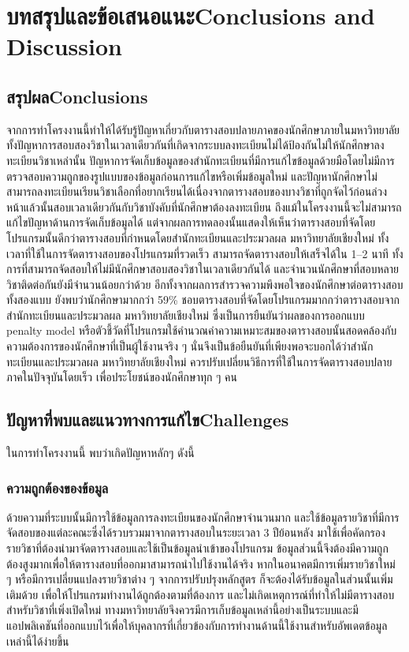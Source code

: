 \chapter{\ifcpe บทสรุปและข้อเสนอแนะ\else Conclusions and Discussion\fi}

\section{\ifcpe สรุปผล\else Conclusions\fi}

จากการทำโครงงานนี้ทำให้ได้รับรู้ปัญหาเกี่ยวกับตารางสอบปลายภาคของนักศึกษาภายในมหาวิทยาลัย
ทั้งปัญหาการสอบสองวิชาในเวลาเดียวกันที่เกิดจากระบบลงทะเบียนไม่ได้ป้องกันไม่ให้นักศึกษาลงทะเบียนวิชาเหล่านั้น
ปัญหาการจัดเก็บข้อมูลของสำนักทะเบียนที่มีการแก้ไขข้อมูลด้วยมือโดยไม่มีการตรวจสอบความถูกของรูปแบบของข้อมูลก่อนการแก้ไขหรือเพิ่มข้อมูลใหม่
และปัญหานักศึกษาไม่สามารถลงทะเบียนเรียนวิชาเลือกที่อยากเรียนได้เนื่องจากตารางสอบของบางวิชาที่ถูกจัดไว้ก่อนล่วงหน้าแล้วนั้นสอบเวลาเดียวกันกับวิชาบังคับที่นักศึกษาต้องลงทะเบียน
ถึงแม้ในโครงงานนี้จะไม่สามารถแก้ไขปัญหาด้านการจัดเก็บข้อมูลได้ แต่จากผลการทดลองนั้นแสดงให้เห็นว่าตารางสอบที่จัดโดยโปรแกรมนั้นดีกว่าตารางสอบที่กำหนดโดยสำนักทะเบียนและประมวลผล มหาวิทยาลัยเชียงใหม่
ทั้งเวลาที่ใช้ในการจัดตารางสอบของโปรแกรมที่รวดเร็ว สามารถจัดตารางสอบให้เสร็จได้ใน 1--2 นาที ทั้งการที่สามารถจัดสอบให้ไม่มีนักศึกษาสอบสองวิชาในเวลาเดียวกันได้
และจำนวนนักศึกษาที่สอบหลายวิชาติดต่อกันยังมีจำนวนน้อยกว่าด้วย อีกทั้งจากผลการสำรวจความพึงพอใจของนักศึกษาต่อตารางสอบทั้งสองแบบ ยังพบว่านักศึกษามากกว่า 59\%
ชอบตารางสอบที่จัดโดยโปรแกรมมากกว่าตารางสอบจากสำนักทะเบียนและประมวลผล มหาวิทยาลัยเชียงใหม่ ซึ่งเป็นการยืนยันว่าผลของการออกแบบ penalty model
หรือตัวชี้วัดที่โปรแกรมใช้คำนวณค่าความเหมาะสมของตารางสอบนั้นสอดคล้องกับความต้องการของนักศึกษาที่เป็นผู้ใช้งานจริง ๆ นั่นจึงเป็นข้อยืนยันที่เพียงพอจะบอกได้ว่าสำนักทะเบียนและประมวลผล มหาวิทยาลัยเชียงใหม่
ควรปรับเปลี่ยนวิธีการที่ใช้ในการจัดตารางสอบปลายภาคในปัจจุบันโดยเร็ว เพื่อประโยชน์ของนักศึกษาทุก ๆ คน

\section{\ifcpe ปัญหาที่พบและแนวทางการแก้ไข\else Challenges\fi}

ในการทำโครงงานนี้ พบว่าเกิดปัญหาหลักๆ ดังนี้
\subsection{ความถูกต้องของข้อมูล}
ด้วยความที่ระบบนั้นมีการใช้ข้อมูลการลงทะเบียนของนักศึกษาจำนวนมาก และใช้ข้อมูลรายวิชาที่มีการจัดสอบของแต่ละคณะซึ่งได้รวบรวมมาจากตารางสอบในระยะเวลา 3 ปีย้อนหลัง 
มาใช้เพื่อคัดกรองรายวิชาที่ต้องนำมาจัดตารางสอบและใช้เป็นข้อมูลนำเข้าของโปรแกรม ข้อมูลส่วนนี้จึงต้องมีความถูกต้องสูงมากเพื่อให้ตารางสอบที่ออกมาสามารถนำไปใช้งานได้จริง
หากในอนาคตมีการเพิ่มรายวิชาใหม่ ๆ หรือมีการเปลี่ยนแปลงรายวิชาต่าง ๆ จากการปรับปรุงหลักสูตร ก็จะต้องได้รับข้อมูลในส่วนนั้นเพิ่มเติมด้วย เพื่อให้โปรแกรมทำงานได้ถูกต้องตามที่ต้องการ
และไม่เกิดเหตุการณ์ที่ทำให้ไม่มีตารางสอบสำหรับวิชาที่เพิ่งเปิดใหม่ ทางมหาวิทยาลัยจึงควรมีการเก็บข้อมูลเหล่านี้อย่างเป็นระบบและมีแอปพลิเคชันที่ออกแบบไว้เพื่อให้บุคลากรที่เกี่ยวข้องกับการทำงานด้านนี้ใช้งานสำหรับอัพเดตข้อมูลเหล่านี้ได้ง่ายขึ้น

